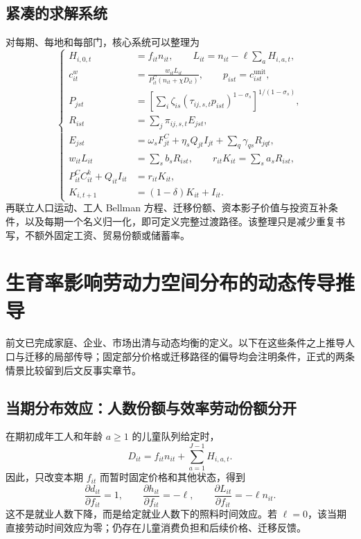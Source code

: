 \documentclass[UTF8,a4paper,zihao=-4,fontset=windows]{ctexart}
\numberwithin{equation}{section}
\newcommand{\pc}{P^{C}}
\newcommand{\invp}{Q}
\begin{document}
\subsection{紧凑的求解系统}
对每期、每地和每部门，核心系统可以整理为
\begin{equation}
 \left\{\begin{aligned}
 H_{i,0,t}&=f_{it}n_{it},\qquad
 L_{it}=n_{it}-\ell\sum_aH_{i,a,t},\\
 c^w_{it}&=\frac{w_{it}L_{it}}{\pc_{it}(n_{it}+\chi D_{it})},\qquad
 p_{ist}=c^{\mathrm{unit}}_{ist},\\
 P_{jst}&=\left[\sum_i\zeta_{is}(\tau_{ij,s,t}p_{ist})^{1-\sigma_s}\right]^{1/(1-\sigma_s)},\\
 R_{ist}&=\sum_j\pi_{ij,s,t}E_{jst},\\
 E_{jst}&=\omega_sF^C_{jt}+\eta_s\invp_{jt}I_{jt}+\sum_q\gamma_{qs}R_{jqt},\\
 w_{it}L_{it}&=\sum_sb_sR_{ist},\qquad
 r_{it}K_{it}=\sum_sa_sR_{ist},\\
 \pc_{it}C^k_{it}+\invp_{it}I_{it}&=r_{it}K_{it},\\
 K_{i,t+1}&=(1-\delta)K_{it}+I_{it}.
 \end{aligned}\right.
 \label{eq:lg-compact-static-capital}
\end{equation}
再联立人口运动、工人 Bellman 方程、迁移份额、资本影子价值与投资互补条件，以及每期一个名义归一化，即可定义完整过渡路径。该整理只是减少重复书写，不额外固定工资、贸易份额或储蓄率。

\section{生育率影响劳动力空间分布的动态传导推导}
\label{sec:lg-transmission}

前文已完成家庭、企业、市场出清与动态均衡的定义。以下在这些条件之上推导人口与迁移的局部传导；固定部分价格或迁移路径的偏导均会注明条件，正式的两条情景比较留到后文反事实章节。


\subsection{当期分布效应：人数份额与效率劳动份额分开}
在期初成年工人和年龄 $a\geq1$ 的儿童队列给定时，
\begin{equation}
 D_{it}=f_{it}n_{it}+\sum_{a=1}^{J-1}H_{i,a,t}.
\end{equation}
因此，只改变本期 $f_{it}$ 而暂时固定价格和其他状态，得到
\begin{equation}
 \frac{\partial d_{it}}{\partial f_{it}}=1,\qquad
 \frac{\partial h_{it}}{\partial f_{it}}=-\ell,\qquad
 \frac{\partial L_{it}}{\partial f_{it}}=-\ell n_{it}.
 \label{eq:lg-contemporaneous-labor}
\end{equation}
这不是就业人数下降，而是给定就业人数下的照料时间效应。若 $\ell=0$，该当期直接劳动时间效应为零；仍存在儿童消费负担和后续价格、迁移反馈。
\end{document}
